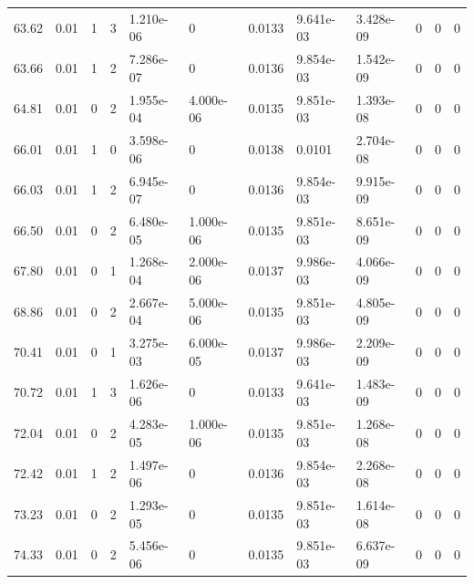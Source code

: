 \documentclass[preview]{standalone}
\begin{document}
{{{\begin{tabular}{L{1.2cm}C{1.2cm} C{0.3cm}C{0.5cm} C{1.4cm}C{1.4cm} C{1.4cm}C{1.4cm} C{1.6cm}C{1.6cm} C{1.6cm}C{1.6cm}}
  63.62  &  0.01  & 1     &  3 &  1.210e-06  & 0  &  0.0133&   9.641e-03& 3.428e-09 & 0   &  0 & 0  \\ 
  63.66  &  0.01  & 1     &  2 &  7.286e-07  & 0  &  0.0136&   9.854e-03& 1.542e-09 & 0   &  0 & 0  \\ 
  64.81  &  0.01  & 0     &  2 &  1.955e-04  & 4.000e-06  &  0.0135&   9.851e-03& 1.393e-08 & 0   &  0 & 0  \\ 
  66.01  &  0.01  & 1     &  0 &  3.598e-06  & 0  &  0.0138&   0.0101& 2.704e-08 & 0   &  0 & 0  \\ 
  66.03  &  0.01  & 1     &  2 &  6.945e-07  & 0  &  0.0136&   9.854e-03& 9.915e-09 & 0   &  0 & 0  \\ 
  66.50  &  0.01  & 0     &  2 &  6.480e-05  & 1.000e-06  &  0.0135&   9.851e-03& 8.651e-09 & 0   &  0 & 0  \\ 
  67.80  &  0.01  & 0     &  1 &  1.268e-04  & 2.000e-06  &  0.0137&   9.986e-03& 4.066e-09 & 0   &  0 & 0  \\ 
  68.86  &  0.01  & 0     &  2 &  2.667e-04  & 5.000e-06  &  0.0135&   9.851e-03& 4.805e-09 & 0   &  0 & 0  \\ 
  70.41  &  0.01  & 0     &  1 &  3.275e-03  & 6.000e-05  &  0.0137&   9.986e-03& 2.209e-09 & 0   &  0 & 0  \\ 
  70.72  &  0.01  & 1     &  3 &  1.626e-06  & 0  &  0.0133&   9.641e-03& 1.483e-09 & 0   &  0 & 0  \\ 
  72.04  &  0.01  & 0     &  2 &  4.283e-05  & 1.000e-06  &  0.0135&   9.851e-03& 1.268e-08 & 0   &  0 & 0  \\ 
  72.42  &  0.01  & 1     &  2 &  1.497e-06  & 0  &  0.0136&   9.854e-03& 2.268e-08 & 0   &  0 & 0  \\ 
  73.23  &  0.01  & 0     &  2 &  1.293e-05  & 0  &  0.0135&   9.851e-03& 1.614e-08 & 0   &  0 & 0  \\ 
  74.33  &  0.01  & 0     &  2 &  5.456e-06  & 0  &  0.0135&   9.851e-03& 6.637e-09 & 0   &  0 & 0  \\ 
\hline 
\end{tabular} 

}}}
\end{document}
